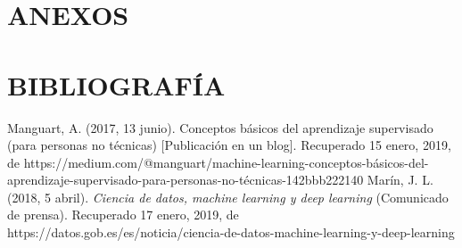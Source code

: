 \documentclass[spanish,12pt, a4paper,twoside]{paper}
\let\oldsection\section
\def\section{\cleardoublepage\oldsection}
\begin{document}
\section*{ANEXOS}


\section*{BIBLIOGRAFÍA}

\newpage

\begin{thebibliography}{00}
Manguart, A. (2017, 13 junio). Conceptos básicos del aprendizaje supervisado (para personas no técnicas) [Publicación en un blog]. Recuperado 15 enero, 2019, de https://medium.com/@manguart/machine-learning-conceptos-básicos-del-aprendizaje-supervisado-para-personas-no-técnicas-142bbb222140
 Marín, J. L. (2018, 5 abril). \emph{Ciencia de datos, machine learning y deep learning} (Comunicado de prensa). Recuperado 17 enero, 2019, de https://datos.gob.es/es/noticia/ciencia-de-datos-machine-learning-y-deep-learning

\end{thebibliography}
\end{document}

